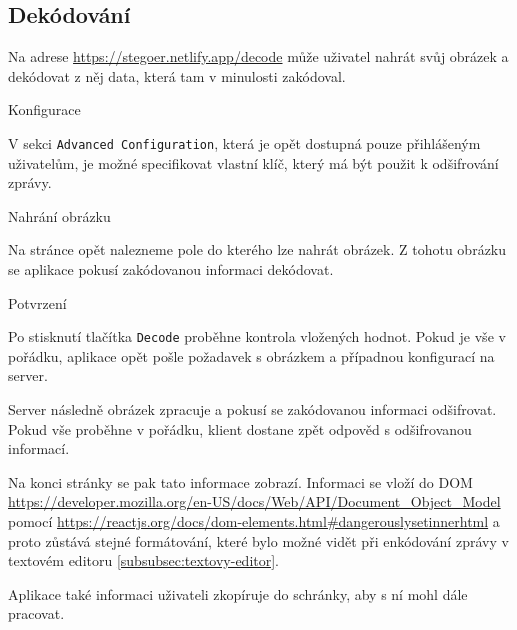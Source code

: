 \subsection{Dekódování}\label{subsec:dekodovani-dat}
Na adrese \url{https://stegoer.netlify.app/decode} může uživatel nahrát svůj
obrázek a dekódovat z něj data, která tam v minulosti zakódoval.

\begin{subsubsection}{Konfigurace}\label{subsubsec:dec-konfigurace}

V sekci \texttt{Advanced Configuration}, která je opět dostupná pouze
přihlášeným uživatelům, je možné specifikovat vlastní klíč, který má být použit
k odšifrování zprávy.

\end{subsubsection}

\begin{subsubsection}{Nahrání obrázku}\label{subsubsec:dec-nahrani-obrazku}

Na stránce opět nalezneme pole do kterého lze nahrát obrázek.
Z tohotu obrázku se aplikace pokusí zakódovanou informaci dekódovat.

\end{subsubsection}

\begin{subsubsection}{Potvrzení}\label{subsubsec:dec-potvrzeni}

Po stisknutí tlačítka \texttt{Decode} proběhne kontrola vložených hodnot.
Pokud je vše v pořádku, aplikace opět pošle požadavek s obrázkem a
případnou konfigurací na server.

Server následně obrázek zpracuje a pokusí se zakódovanou informaci odšifrovat.
Pokud vše proběhne v pořádku, klient dostane zpět odpověd s odšifrovanou
informací.

Na konci stránky se pak tato informace zobrazí.
Informaci se vloží do DOM
\url{https://developer.mozilla.org/en-US/docs/Web/API/Document_Object_Model}
pomocí \url{https://reactjs.org/docs/dom-elements.html\#dangerouslysetinnerhtml}
a proto zůstává stejné formátování, které bylo možné vidět při enkódování
zprávy v textovém editoru \ref{subsubsec:textovy-editor}.

Aplikace také informaci uživateli zkopíruje do schránky, aby s ní mohl dále
pracovat.

\end{subsubsection}
